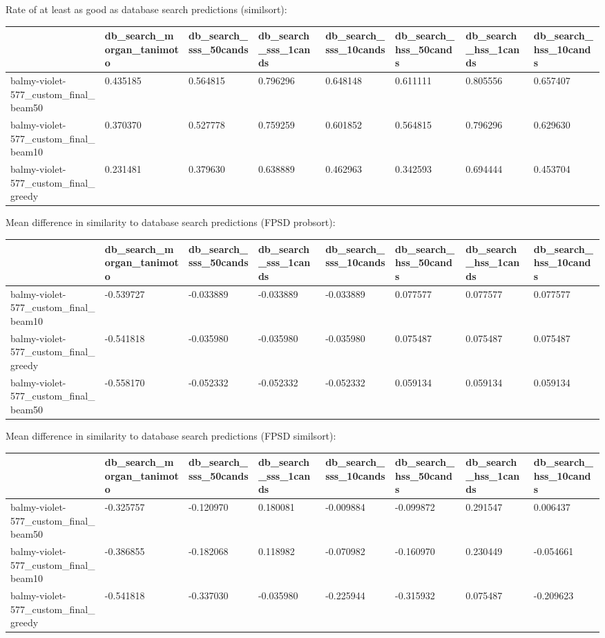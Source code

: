 Rate of at least as good as database search predictions (similsort):
\begin{tabular}{llllllll}
\toprule
 & db_search_morgan_tanimoto & db_search_sss_50cands & db_search_sss_1cands & db_search_sss_10cands & db_search_hss_50cands & db_search_hss_1cands & db_search_hss_10cands \\
\midrule
balmy-violet-577_custom_final_beam50 & 0.435185 & 0.564815 & 0.796296 & 0.648148 & 0.611111 & 0.805556 & 0.657407 \\
balmy-violet-577_custom_final_beam10 & 0.370370 & 0.527778 & 0.759259 & 0.601852 & 0.564815 & 0.796296 & 0.629630 \\
balmy-violet-577_custom_final_greedy & 0.231481 & 0.379630 & 0.638889 & 0.462963 & 0.342593 & 0.694444 & 0.453704 \\
\bottomrule
\end{tabular}



Mean difference in similarity to database search predictions (FPSD probsort):
\begin{tabular}{llllllll}
\toprule
 & db_search_morgan_tanimoto & db_search_sss_50cands & db_search_sss_1cands & db_search_sss_10cands & db_search_hss_50cands & db_search_hss_1cands & db_search_hss_10cands \\
\midrule
balmy-violet-577_custom_final_beam10 & -0.539727 & -0.033889 & -0.033889 & -0.033889 & 0.077577 & 0.077577 & 0.077577 \\
balmy-violet-577_custom_final_greedy & -0.541818 & -0.035980 & -0.035980 & -0.035980 & 0.075487 & 0.075487 & 0.075487 \\
balmy-violet-577_custom_final_beam50 & -0.558170 & -0.052332 & -0.052332 & -0.052332 & 0.059134 & 0.059134 & 0.059134 \\
\bottomrule
\end{tabular}



Mean difference in similarity to database search predictions (FPSD similsort):
\begin{tabular}{llllllll}
\toprule
 & db_search_morgan_tanimoto & db_search_sss_50cands & db_search_sss_1cands & db_search_sss_10cands & db_search_hss_50cands & db_search_hss_1cands & db_search_hss_10cands \\
\midrule
balmy-violet-577_custom_final_beam50 & -0.325757 & -0.120970 & 0.180081 & -0.009884 & -0.099872 & 0.291547 & 0.006437 \\
balmy-violet-577_custom_final_beam10 & -0.386855 & -0.182068 & 0.118982 & -0.070982 & -0.160970 & 0.230449 & -0.054661 \\
balmy-violet-577_custom_final_greedy & -0.541818 & -0.337030 & -0.035980 & -0.225944 & -0.315932 & 0.075487 & -0.209623 \\
\bottomrule
\end{tabular}



